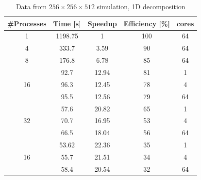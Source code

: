 \begin{table}
\caption{Data from $256\times 256\times 512$  simulation, 1D decomposition}
\begin{center}
\begin{tabular}{c c c c c}
\toprule
\textbf{\#Processes} & \textbf{Time [s]} & \textbf{Speedup} & \textbf{Efficiency [\%]} & \textbf{cores}\\
\midrule
1 & 1198.75 & 1 & 100 & 64\\
4 &  333.7 & 3.59 & 90 & 64\\
8 &  176.8 & 6.78 & 85 & 64\\
\hline
\multirow{3}{*}{16} &  92.7 & 12.94 & 81 & 1\\
& 96.3 & 12.45 & 78 & 4\\
& 95.5 & 12.56 & 79 & 64\\
\hline
\multirow{3}{*}{32} &  57.6 & 20.82 & 65 & 1\\
& 70.7 & 16.95 & 53 & 4\\
& 66.5 & 18.04 & 56 & 64\\
\hline
\multirow{3}{*}{16} &  53.62 & 22.36 & 35 & 1\\
& 55.7 & 21.51 & 34 & 4\\
& 58.4 & 20.54 & 32 & 64\\
\bottomrule
\end{tabular}
\end{center}
\label{128:data:1}
\end{table}

